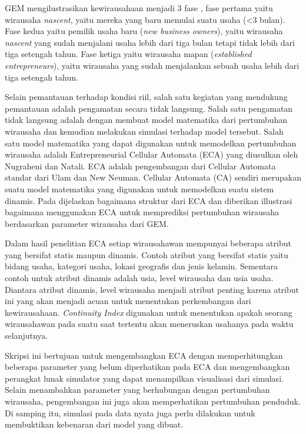 GEM mengilustrasikan kewirausahaan menjadi 3 fase \cite{GEM2013}, fase pertama yaitu wirausaha \textit{nascent}, yaitu mereka yang baru memulai suatu usaha (<3 bulan). Fase kedua yaitu pemilik usaha baru (\textit{new business owners}), yaitu wirausaha \textit{nascent} yang sudah menjalani usaha lebih dari tiga bulan tetapi tidak lebih dari tiga setengah tahun. Fase ketiga yaitu wirausaha mapan (\textit{established entrepreneurs}), yaitu wirausaha yang sudah menjalankan sebuah usaha lebih dari tiga setengah tahun.


Selain pemantauan terhadap kondisi riil, salah satu kegiatan yang mendukung pemantauan adalah pengamatan secara tidak langsung. Salah satu pengamatan tidak langsung adalah dengan membuat model matematika dari pertumbuhan wirausaha dan kemudian melakukan simulasi terhadap model tersebut. Salah satu model matematika yang dapat digunakan untuk memodelkan pertumbuhan wirausaha adalah Entrepreneurial Cellular Automata (ECA) yang diusulkan oleh Nugraheni dan Natali. ECA adalah pengembangan dari Cellular Automata standar dari Ulam dan New Neuman. Cellular Automata (CA) sendiri merupakan suatu model matematika yang digunakan untuk memodelkan suatu sistem dinamis. Pada \cite{ECA} dijelaskan bagaimana struktur dari ECA dan diberikan illustrasi bagaimana menggunakan ECA untuk memprediksi pertumbuhan wirausaha berdasarkan parameter wirausaha dari GEM. 


Dalam hasil penelitian ECA setiap wirausahawan mempunyai beberapa atribut yang bersifat statis maupun dinamis. Contoh atribut yang bersifat statis yaitu bidang usaha, kategori usaha, lokasi geografis dan jenis kelamin. Sementara contoh untuk atribut dinamis adalah usia, level wirausaha dan usia usaha. Diantara atribut dinamis, level wirausaha menjadi atribut penting karena atribut ini yang akan menjadi acuan untuk menentukan perkembangan dari kewirausahaan. \textit{Continuity Index} digunakan untuk menentukan apakah seorang wirausahawan pada suatu saat tertentu akan meneruskan usahanya pada waktu selanjutnya.


Skripsi ini bertujuan untuk mengembangkan ECA dengan memperhitungkan beberapa parameter yang belum diperhatikan pada ECA dan mengembangkan perangkat lunak simulator yang dapat menampilkan visualisasi dari simulasi. Selain menambahkan parameter yang berhubungan dengan pertumbuhan wirausaha, pengembangan ini juga akan memperhatikan pertumbuhan penduduk. Di samping itu, simulasi pada data nyata juga perlu dilakukan untuk membuktikan kebenaran dari model yang dibuat.







